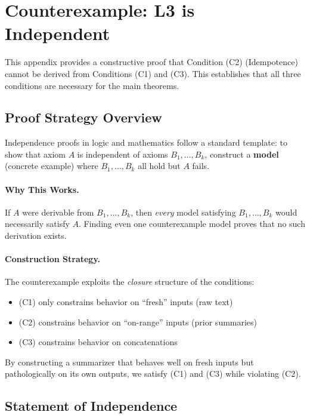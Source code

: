 \section{Counterexample: L3 is Independent}
\label{app:counterexample}

This appendix provides a constructive proof that Condition (C2) (Idempotence) cannot be derived from Conditions (C1) and (C3). This establishes that all three conditions are necessary for the main theorems.

\subsection{Proof Strategy Overview}

Independence proofs in logic and mathematics follow a standard template: to show that axiom $A$ is independent of axioms $B_1, \ldots, B_k$, construct a \textbf{model} (concrete example) where $B_1, \ldots, B_k$ all hold but $A$ fails.

\paragraph{Why This Works.}
If $A$ were derivable from $B_1, \ldots, B_k$, then \emph{every} model satisfying $B_1, \ldots, B_k$ would necessarily satisfy $A$. Finding even one counterexample model proves that no such derivation exists.

\paragraph{Construction Strategy.}
The counterexample exploits the \emph{closure} structure of the conditions:
\begin{itemize}
    \item (C1) only constrains behavior on ``fresh'' inputs (raw text)
    \item (C2) constrains behavior on ``on-range'' inputs (prior summaries)
    \item (C3) constrains behavior on concatenations
\end{itemize}
By constructing a summarizer that behaves well on fresh inputs but pathologically on its own outputs, we satisfy (C1) and (C3) while violating (C2).

\subsection{Statement of Independence}

